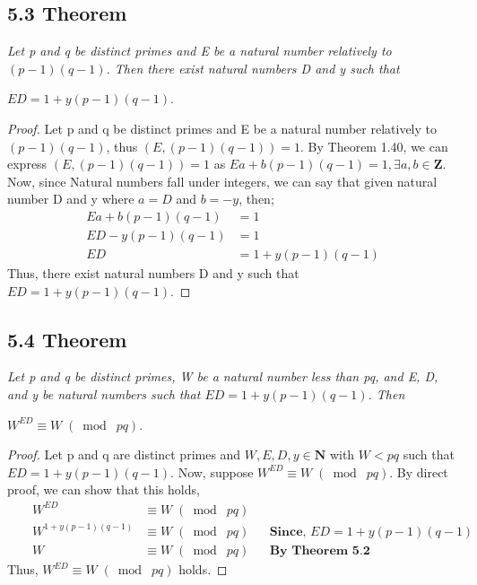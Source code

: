 \documentclass{article}
\begin{document}
\subsection*{5.3 Theorem} 
\quad \textit{Let p and q be distinct primes and E be a natural number relatively to $(p-1)(q-1)$. Then there exist natural numbers D and y such that}
\begin{center}
    $ED = 1 + y(p-1)(q-1)$.
\end{center}

\begin{proof}
Let p and q be distinct primes and E be a natural number relatively to $(p-1)(q-1)$, thus $(E, (p-1)(q-1)) = 1$. By Theorem 1.40, we can express $(E, (p-1)(q-1)) = 1$ as $Ea + b(p-1)(q-1) = 1, \exists a,b \in \mathbf{Z}$. Now, since Natural numbers fall under integers, we can say that given natural number D and y where $a = D$ and $b = -y$, then;
\begin{align*}
    && Ea + b(p-1)(q-1) &= 1 &&\\
    && ED - y(p-1)(q-1) &= 1 &&\\
    && ED &= 1 + y(p-1)(q-1) &&
\end{align*}
Thus, there exist natural numbers D and y such that $ED = 1 + y(p-1)(q-1)$.
\end{proof}

\subsection*{5.4 Theorem} 
\quad \textit{Let p and q be distinct primes, W be a natural number less than pq, and E, D, and y be natural numbers such that $ED = 1 + y(p-1)(q-1)$. Then}
\begin{center}
    $W^{ED} \equiv W \;(\bmod\; pq)$.
\end{center}

\begin{proof}
Let p and q are distinct primes and $W,E,D,y \in \mathbf{N}$ with $W<pq$ such that $ED = 1 + y(p-1)(q-1)$. Now, suppose $W^{ED} \equiv W \;(\bmod\; pq)$. By direct proof, we can show that this holds,
\begin{align*}
    &&W^{ED} &\equiv W \;(\bmod\; pq)&&\\
    &&W^{1 + y(p-1)(q-1)} &\equiv W \;(\bmod\; pq)&& \textbf{Since, $ED = 1 + y(p-1)(q-1)$}\\
    &&W &\equiv W \;(\bmod\; pq)&& \textbf{By Theorem 5.2}
\end{align*}
Thus, $W^{ED} \equiv W \;(\bmod\; pq)$ holds.
\end{proof}
\end{document}
